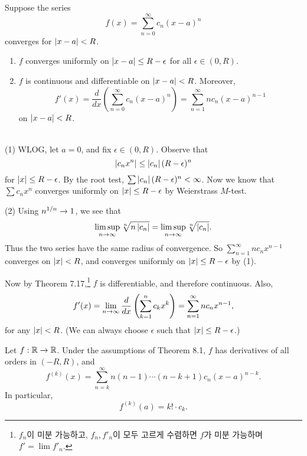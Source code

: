  Suppose the series
\[
    f(x) = \sum_{n=0}^\infty c_n (x-a)^n
\]
converges for \(\left| x - a \right| < R\).
\begin{enumerate}
    \item \(f\) converges uniformly on \(\left| x - a \right| \leq R - \epsilon\) for all \(\epsilon \in (0, R)\).
    \item \(f\) is continuous and differentiable on \(\left| x - a \right| < R\). Moreover,
          \[
              f'(x) = \frac{d}{dx}\left(\sum_{n=0}^\infty c_n(x-a)^n\right) = \sum_{n=1}^\infty n c_n(x-a)^{n-1}
          \]
          on \(\left| x - a \right| < R\).
\end{enumerate}

\pf \\
(1) WLOG, let \(a = 0\), and fix \(\epsilon \in (0, R)\). Observe that
\[
    \left| c_n x^n \right| \leq \left| c_n \right| (R-\epsilon)^n
\]
for \(\left| x \right| \leq R - \epsilon\). By the root test, \(\sum \left| c_n \right| (R-\epsilon)^n < \infty\). Now we know that \(\sum c_nx^n\) converges uniformly on \(\left| x \right| \leq R-\epsilon\) by Weierstrass \(M\)-test.

(2) Using \(n^{1/n} \rightarrow 1\), we see that
\[
    \limsup_{n\rightarrow\infty} \sqrt[n]{n\left| c_n \right|} = \limsup_{n\rightarrow\infty} \sqrt[n]{\left| c_n \right|}.
\]
Thus the two series have the same radius of convergence. So \(\sum_{n=1}^\infty n c_n x^{n-1}\) converges on \(\left| x \right| < R\), and converges uniformly on \(\left| x \right| \leq R - \epsilon\) by (1).

Now by Theorem 7.17,\footnote{\(f_n\)이 미분 가능하고, \(f_n, f'_n\)이 모두 고르게 수렴하면 \(f\)가 미분 가능하며 \(f' = \lim f'_n\).} \(f\) is differentiable, and therefore continuous. Also,
\[
    f'(x) = \lim_{n \rightarrow\infty} \frac{d}{dx} \left(\sum_{k=1}^n c_k x^k\right) = \sum_{n=1}^\infty n c_nx^{n-1},
\]
for any \(\left| x \right| < R\). (We can always choose \(\epsilon\) such that \(\left| x \right| \leq R - \epsilon\).)

\cor Let \(f : \mathbb{R} \rightarrow \mathbb{R}\). Under the assumptions of Theorem 8.1, \(f\) has derivatives of all orders in \((-R, R)\), and
\[
    f^{(k)}(x) = \sum_{n=k}^\infty n(n-1)\cdots(n-k+1)c_n(x-a)^{n-k}.
\]
In particular,
\[
    f^{(k)}(a) = k! \cdot c_k.
\]

\pagebreak
